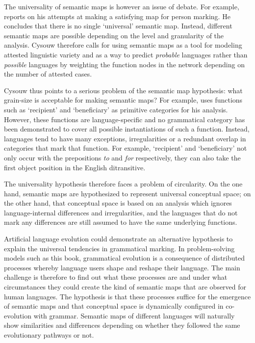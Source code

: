The universality of semantic maps is however an issue of debate. For example, \citet{cysouw08building} reports on his attempts at making a satisfying map for person marking. He concludes that there is no single `universal' semantic map. Instead, different semantic maps are possible depending on the level and granularity of the analysis. Cysouw therefore calls for using semantic maps as a tool for modeling attested linguistic variety and as a way to predict {\em probable} languages rather than {\em possible} languages by weighting the function nodes in the network depending on the number of attested cases.

Cysouw thus points to a serious problem of the semantic map hypothesis: what grain-size is acceptable for making semantic maps? For example, \citet{haspelmath03geometry} uses functions such as `recipient' and `beneficiary' as primitive categories for his analysis. However, these functions are language-specific and no grammatical category has been demonstrated to cover all possible instantiations of such a function. Instead, languages tend to have many exceptions, irregularities or a redundant overlap in categories that mark that function. For example, `recipient' and `beneficiary' not only occur with the prepositions {\em to} and {\em for} respectively, they can also take the first object position in the English ditransitive.

The universality hypothesis therefore faces a problem of circularity. On the one hand, semantic maps are hypothesized to represent universal conceptual space; on the other hand, that conceptual space is based on an analysis which ignores language-internal differences and irregularities, and the languages that do not mark any differences are still assumed to have the same underlying functions.

Artificial language evolution could demonstrate an alternative hypothesis to explain the universal tendencies in grammatical marking. In problem-solving models such as this book, grammatical evolution is a consequence of distributed processes whereby language users shape and reshape their language. The main challenge is therefore to find out what these processes are and under what circumstances they could create the kind of semantic maps that are observed for human languages. The hypothesis is that these processes suffice for the emergence of semantic maps and that conceptual space is dynamically configured in co-evolution with grammar. Semantic maps of different languages will naturally show similarities and differences depending on whether they followed the same evolutionary pathways or not.


